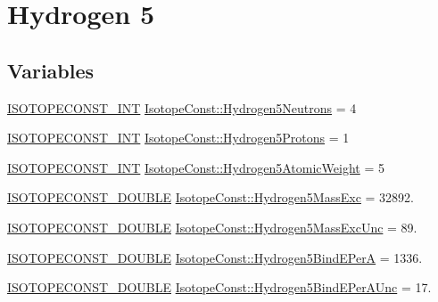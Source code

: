 \hypertarget{group___isotope_const-_hydrogen-_h5}{}\section{Hydrogen 5}
\label{group___isotope_const-_hydrogen-_h5}
\subsection*{Variables}
\begin{DoxyCompactItemize}
\item 
\mbox{\hyperlink{group___isotope_const-_macros_ga5f18360b3e99483a35c32d789e62621c}{I\+S\+O\+T\+O\+P\+E\+C\+O\+N\+S\+T\+\_\+\+I\+NT}} \mbox{\hyperlink{group___isotope_const-_hydrogen-_h5_ga56a5011302e6d29fd8c42faffaaf0248}{Isotope\+Const\+::\+Hydrogen5\+Neutrons}} = 4
\item 
\mbox{\hyperlink{group___isotope_const-_macros_ga5f18360b3e99483a35c32d789e62621c}{I\+S\+O\+T\+O\+P\+E\+C\+O\+N\+S\+T\+\_\+\+I\+NT}} \mbox{\hyperlink{group___isotope_const-_hydrogen-_h5_ga33e9d2d41a1c32fce3a8e0b5936631a2}{Isotope\+Const\+::\+Hydrogen5\+Protons}} = 1
\item 
\mbox{\hyperlink{group___isotope_const-_macros_ga5f18360b3e99483a35c32d789e62621c}{I\+S\+O\+T\+O\+P\+E\+C\+O\+N\+S\+T\+\_\+\+I\+NT}} \mbox{\hyperlink{group___isotope_const-_hydrogen-_h5_gaf06d949c392165534c3962b9d9826b2b}{Isotope\+Const\+::\+Hydrogen5\+Atomic\+Weight}} = 5
\item 
\mbox{\hyperlink{group___isotope_const-_macros_ga8f45a7272ce02c0b4c65c44636ed719a}{I\+S\+O\+T\+O\+P\+E\+C\+O\+N\+S\+T\+\_\+\+D\+O\+U\+B\+LE}} \mbox{\hyperlink{group___isotope_const-_hydrogen-_h5_ga760c2945a9ee1d4d2fe198eaa1c2e794}{Isotope\+Const\+::\+Hydrogen5\+Mass\+Exc}} = 32892.
\item 
\mbox{\hyperlink{group___isotope_const-_macros_ga8f45a7272ce02c0b4c65c44636ed719a}{I\+S\+O\+T\+O\+P\+E\+C\+O\+N\+S\+T\+\_\+\+D\+O\+U\+B\+LE}} \mbox{\hyperlink{group___isotope_const-_hydrogen-_h5_gaee4efc759ddcb3872db1a63ff5d3a534}{Isotope\+Const\+::\+Hydrogen5\+Mass\+Exc\+Unc}} = 89.
\item 
\mbox{\hyperlink{group___isotope_const-_macros_ga8f45a7272ce02c0b4c65c44636ed719a}{I\+S\+O\+T\+O\+P\+E\+C\+O\+N\+S\+T\+\_\+\+D\+O\+U\+B\+LE}} \mbox{\hyperlink{group___isotope_const-_hydrogen-_h5_gaf92ad64b11dc0cad09996f7128dbc32a}{Isotope\+Const\+::\+Hydrogen5\+Bind\+E\+PerA}} = 1336.
\item 
\mbox{\hyperlink{group___isotope_const-_macros_ga8f45a7272ce02c0b4c65c44636ed719a}{I\+S\+O\+T\+O\+P\+E\+C\+O\+N\+S\+T\+\_\+\+D\+O\+U\+B\+LE}} \mbox{\hyperlink{group___isotope_const-_hydrogen-_h5_gaee7ae21948a656f4a49f346604da6028}{Isotope\+Const\+::\+Hydrogen5\+Bind\+E\+Per\+A\+Unc}} = 17.

\end{DoxyCompactItemize}
